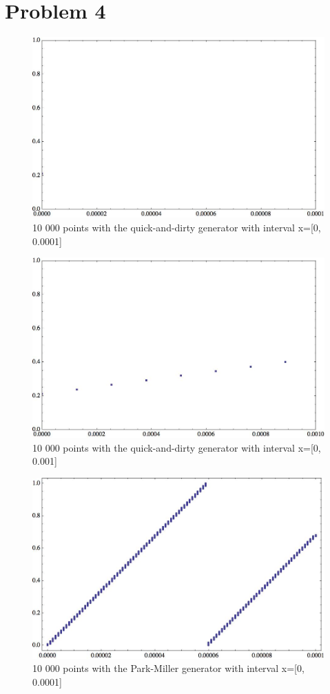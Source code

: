 \documentclass[12pt]{article}
\numberwithin{equation}{section}
\numberwithin{table}{section}
\begin{document}
\section*{Problem 4}
\begin{figure}
\caption{10 000 points with the quick-and-dirty generator with interval x=[0, 0.0001]}
\includegraphics[width=15cm]{qd3.jpg}
\end{figure}
\begin{figure}
\caption{10 000 points with the quick-and-dirty generator with interval x=[0, 0.001]}
\includegraphics[width=15cm]{qd4.jpg}
\end{figure}
\begin{figure}
\caption{10 000 points with the Park-Miller generator with interval x=[0, 0.0001]}
\includegraphics[width=15cm]{pm3.jpg}
\end{figure}
\end{document}
